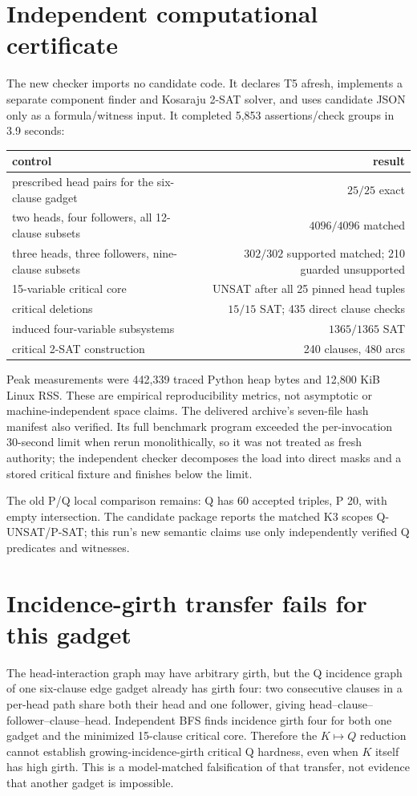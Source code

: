\documentclass[11pt]{article}
\begin{document}
\section{Independent computational certificate}
The new checker imports no candidate code.  It declares T5 afresh, implements a separate component finder and Kosaraju 2-SAT solver, and uses candidate JSON only as a formula/witness input.  It completed 5,853 assertions/check groups in 3.9 seconds:
\begin{center}
\begin{tabular}{lr}
\toprule
control & result\\\midrule
prescribed head pairs for the six-clause gadget & $25/25$ exact\\
two heads, four followers, all 12-clause subsets & $4096/4096$ matched\\
three heads, three followers, nine-clause subsets & $302/302$ supported matched; 210 guarded unsupported\\
15-variable critical core & UNSAT after all 25 pinned head tuples\\
critical deletions & $15/15$ SAT; 435 direct clause checks\\
induced four-variable subsystems & $1365/1365$ SAT\\
critical 2-SAT construction & 240 clauses, 480 arcs\\
\bottomrule
\end{tabular}
\end{center}
Peak measurements were 442,339 traced Python heap bytes and 12,800 KiB Linux RSS.  These are empirical reproducibility metrics, not asymptotic or machine-independent space claims.  The delivered archive's seven-file hash manifest also verified.  Its full benchmark program exceeded the per-invocation 30-second limit when rerun monolithically, so it was not treated as fresh authority; the independent checker decomposes the load into direct masks and a stored critical fixture and finishes below the limit.

The old P/Q local comparison remains: Q has 60 accepted triples, P 20, with empty intersection.  The candidate package reports the matched K3 scopes Q-UNSAT/P-SAT; this run's new semantic claims use only independently verified Q predicates and witnesses.

\section{Incidence-girth transfer fails for this gadget}
The head-interaction graph may have arbitrary girth, but the Q incidence graph of one six-clause edge gadget already has girth four: two consecutive clauses in a per-head path share both their head and one follower, giving head--clause--follower--clause--head.  Independent BFS finds incidence girth four for both one gadget and the minimized 15-clause critical core.  Therefore the $K\mapsto Q$ reduction cannot establish growing-incidence-girth critical Q hardness, even when $K$ itself has high girth.  This is a model-matched falsification of that transfer, not evidence that another gadget is impossible.
\end{document}
